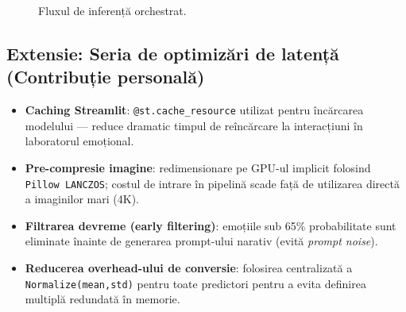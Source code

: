 \begin{figure}[!htbp]
  \centering
  \caption{Fluxul de inferență orchestrat.}
  \label{fig:c5-inference-flow}
\end{figure}

\subsection*{Extensie: Seria de optimizări de latență (Contribuție personală)}
\begin{itemize}
  \item \textbf{Caching Streamlit}: \texttt{@st.cache\_resource} utilizat pentru încărcarea modelului — reduce dramatic timpul de reîncărcare la interacțiuni în laboratorul emoțional.
  \item \textbf{Pre-compresie imagine}: redimensionare pe GPU-ul implicit folosind \texttt{Pillow LANCZOS}; costul de intrare în pipelină scade față de utilizarea directă a imaginilor mari (4K).
  \item \textbf{Filtrarea devreme (early filtering)}: emoțiile sub 65\% probabilitate sunt eliminate înainte de generarea prompt-ului narativ (evită \emph{prompt noise}).
  \item \textbf{Reducerea overhead-ului de conversie}: folosirea centralizată a \texttt{Normalize(mean,std)} pentru toate predictori pentru a evita definirea multiplă redundată în memorie.
\end{itemize}

